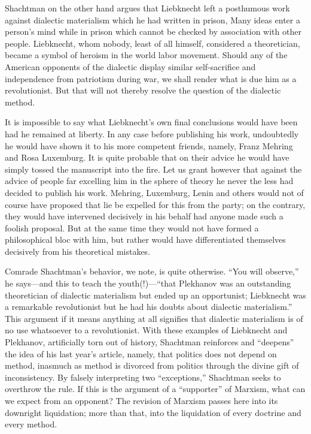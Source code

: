 Shachtman on the other hand argues that Liebknecht left a posthumous work against dialectic materialism which he had written in prison, Many ideas enter a person’s mind while in prison which cannot be checked by association with other people. Liebknecht, whom nobody, least of all himself, considered a theoretician, became a symbol of heroism in the world labor movement. Should any of the American opponents of the dialectic display similar self-sacrifice and independence from patriotism during war, we shall render what is due him as a revolutionist. But that will not thereby resolve the question of the dialectic method.

It is impossible to say what Liebknecht’s own final conclusions would have been had he remained at liberty. In any case before publishing his work, undoubtedly he would have shown it to his more competent friends, namely, Franz Mehring and Rosa Luxemburg. It is quite probable that on their advice he would have simply tossed the manuscript into the fire. Let us grant however that against the advice of people far excelling him in the sphere of theory he never the less had decided to publish his work. Mehring, Luxemburg, Lenin and others would not of course have proposed that lie be expelled for this from the party; on the contrary, they would have intervened decisively in his behalf had anyone made such a foolish proposal. But at the same time they would not have formed a philosophical bloc with him, but rather would have differentiated themselves decisively from his theoretical mistakes.

Comrade Shachtman’s behavior, we note, is quite otherwise. “You will observe,” he says---and this to teach the youth(!)---“that Plekhanov was an outstanding theoretician of dialectic materialism but ended up an opportunist; Liebknecht was a remarkable revolutionist but he had his doubts about dialectic materialism.” This argument if it means anything at all signifies that dialectic materialism is of no use whatsoever to a revolutionist. With these examples of Liebknecht and Plekhanov, artificially torn out of history, Shachtman reinforces and “deepens” the idea of his last year’s article, namely, that politics does not depend on method, inasmuch as method is divorced from politics through the divine gift of inconsistency. By falsely interpreting two “exceptions,” Shachtman seeks to overthrow the rule. If this is the argument of a “supporter” of Marxism, what can we expect from an opponent? The revision of Marxism passes here into its downright liquidation; more than that, into the liquidation of every doctrine and every method.

